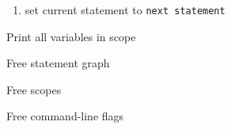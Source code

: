 \documentclass[letterpaper,11pt]{article}
\begin{document}
{{{\begin{enumerate}
{\begin{enumerate}
\begin{itemize}
								loop and consider next time executing as
								"first time".
								The reduction rules that generated the loop
								statement add a GOTO back to the loop statement
								at the end of the body.
						\end{itemize}
					\item set current statement to \texttt{next statement}
				\end{enumerate}
				\item Print all variables in scope
				\item Free statement graph
				\item Free scopes
				\item Free command-line flags
			}
			\end{enumerate}
		}
	}

}
\end{document}
